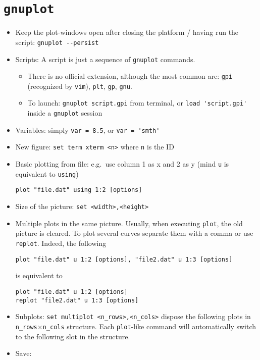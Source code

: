 \documentclass[a4paper,12pt,%
              final%
              ]{article}
\begin{document}
\section{\texttt{gnuplot}}
\begin{itemize}
  \item Keep the plot-windows open after closing the platform / having run the script: \verb|gnuplot --persist|
  \item Scripts: A script is just a sequence of \texttt{gnuplot} commands.
    \begin{itemize}
      \item There is no official extension, although the most common are: \texttt{gpi} (recognized by \texttt{vim}), \texttt{plt}, \texttt{gp}, \texttt{gnu}.
      \item To launch: \verb|gnuplot script.gpi| from terminal, or \verb|load 'script.gpi'| inside a \verb|gnuplot| session
    \end{itemize}
  \item Variables: simply \verb|var = 8.5|, or \verb|var = 'smth'|
  \item New figure: \verb|set term xterm <n>| where \verb|n| is the ID
  \item Basic plotting from file: e.g.~use column 1 as x and 2 as y (mind \texttt{u} is equivalent to \texttt{using})
\begin{verbatim}
plot "file.dat" using 1:2 [options]
\end{verbatim}
  \item Size of the picture: \verb|set <width>,<height>|
  \item Multiple plots in the same picture. Usually, when executing \texttt{plot}, the old picture is cleared. To plot several curves separate them with a comma or use \verb|replot|. Indeed, the following
\begin{verbatim}
plot "file.dat" u 1:2 [options], "file2.dat" u 1:3 [options]
\end{verbatim}
    is equivalent to
\begin{verbatim}
plot "file.dat" u 1:2 [options]
replot "file2.dat" u 1:3 [options]
\end{verbatim}
  \item Subplots: \verb|set multiplot <n_rows>,<n_cols>| dispose the following plots in \verb|n_rows|$\times$\verb|n_cols| structure. Each \verb|plot|-like command will automatically switch to the following slot in the structure.
  \item Save:
    \begin{enumerate}

\end{enumerate}
\end{itemize}
\end{document}
